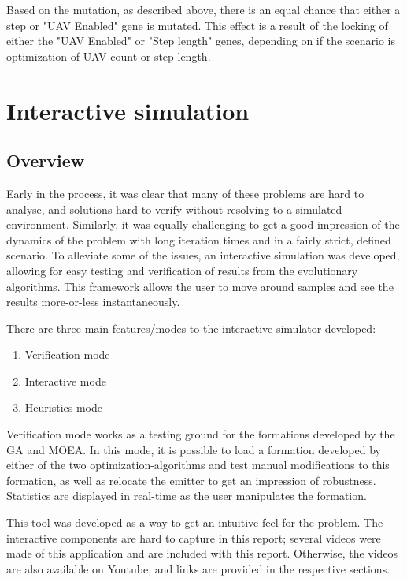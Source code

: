 \documentclass[10pt,a4paper]{book}
\begin{document}
Based on the mutation, as described above, there is an equal chance that either a step or "\gls{UAV} Enabled" gene is mutated. This effect is a result of the locking of either the "UAV Enabled" or "Step length" genes, depending on if the scenario is optimization of \gls{UAV}-count or step length. 




\newpage

\section{Interactive simulation}

\subsection{Overview}

Early in the process, it was clear that many of these problems are hard to analyse, and solutions hard to verify without resolving to a simulated environment. Similarly, it was equally challenging to get a good impression of the dynamics of the problem with long iteration times and in a fairly strict, defined scenario. To alleviate some of the issues, an interactive simulation was developed, allowing for easy testing and verification of results from the evolutionary algorithms. This framework allows the user to move around samples and see the results more-or-less instantaneously. 

There are three main features/modes to the interactive simulator developed:

\begin{enumerate}
\item Verification mode
\item Interactive mode
\item Heuristics mode
\end{enumerate}


Verification mode works as a testing ground for the formations developed by the \gls{GA} and \gls{MOEA}. In this mode, it is possible to load a formation developed by either of the two optimization-algorithms and test manual modifications to this formation, as well as relocate the emitter to get an impression of robustness. Statistics are displayed in real-time as the user manipulates the formation.

This tool was developed as a way to get an intuitive feel for the problem. The interactive components are hard to capture in this report; several videos were made of this application and are included with this report. Otherwise, the videos are also available on Youtube, and links are provided in the respective sections.
\end{document}
